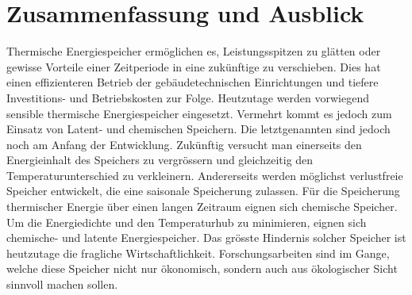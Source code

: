 \documentclass[11pt,a4paper]{scrartcl}
\begin{document}
\section{Zusammenfassung und Ausblick}
Thermische Energiespeicher ermöglichen es, Leistungsspitzen zu glätten oder
gewisse Vorteile einer Zeitperiode in eine zukünftige zu verschieben. Dies hat
einen effizienteren Betrieb der gebäudetechnischen Einrichtungen und tiefere
Investitions- und Betriebskosten zur Folge. Heutzutage werden vorwiegend
sensible thermische Energiespeicher eingesetzt. Vermehrt kommt es jedoch zum
Einsatz von Latent- und chemischen Speichern. Die letztgenannten sind jedoch
noch am Anfang der Entwicklung. Zukünftig versucht man einerseits den
Energieinhalt des Speichers zu vergrössern und gleichzeitig den
Temperaturunterschied zu verkleinern. Andererseits werden möglichst verlustfreie
Speicher entwickelt, die eine saisonale Speicherung zulassen. Für die
Speicherung thermischer Energie über einen langen Zeitraum eignen sich chemische
Speicher. Um die Energiedichte und den Temperaturhub zu minimieren, eignen sich
chemische- und latente Energiespeicher. Das grösste Hindernis solcher Speicher
ist heutzutage die fragliche Wirtschaftlichkeit. Forschungsarbeiten sind im
Gange, welche diese Speicher nicht nur ökonomisch, sondern auch aus ökologischer
Sicht sinnvoll machen sollen.
\newpage
\listoftables
\newpage
\listoffigures
\newpage
\end{document}
